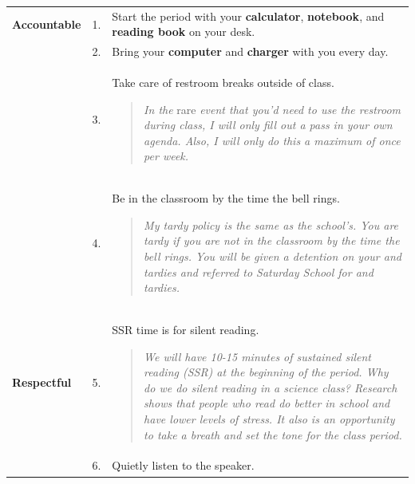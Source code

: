 \documentclass[10pt]{exam}
\newcommand{\mg}{\rowcolor{Goldenrod}}
\begin{document}
\begin{center}
  \begin{tabular}
    {
      p{}
      p{}
      p{}
		}
		
    \hline
      \mg \bf Accountable 
      			&  1. & Start the period with your {\bf calculator}, 
                  {\bf notebook}, and {\bf reading book} on your 
                  desk.
      \\
      \mg   &  2. & Bring your {\bf computer} and {\bf charger} with you
                  every day.
      \\
      \mg 	&  3. & Take care of restroom breaks outside of 
                  class.
                  \vspace{-1em}
                  \begin{quotation}
                  	\noindent\small
										\textit{In the} rare \textit{event that you’d need to use the restroom 
										during class, I will only fill out a pass in your own agenda.  Also, I will 
										only do this a maximum of once per week.}
										\vspace{-1.5em}
                  \end{quotation}

      \\
     	\mg   &  4. & Be in the classroom by the time the bell 
                  rings.
                  \vspace{-1em}
                  \begin{quotation}
                  	\noindent\small
										\textit{My tardy policy is the same as the school’s. You are tardy if you 
										are not in the classroom by the time the bell rings.  You will be given 
										a detention on your \nth{3} and \nth{4} tardies and referred to Saturday School 
										for \nth{5} and \nth{6} tardies.}
										\vspace{-1.5em}
                  \end{quotation}
      \\  
    
    \hline
    \bf Respectful
          &  5. & SSR time is for silent reading.
                 	\vspace{-1em}
                  \begin{quotation}
                  	\noindent\small
										\textit{We will have 10-15 minutes of sustained silent reading (SSR) 
										at the beginning of the period.  Why do we do silent reading in a 
										science class?  Research shows that people who read do better in 
										school and have lower levels of stress.  It also is an opportunity to 
										take a breath and set the tone for the class period.}
										\vspace{-1.5em}
                  \end{quotation}
          \\   
          &  6. & Quietly listen to the speaker.         
          \\  


\end{tabular}
\end{center}
\end{document}
